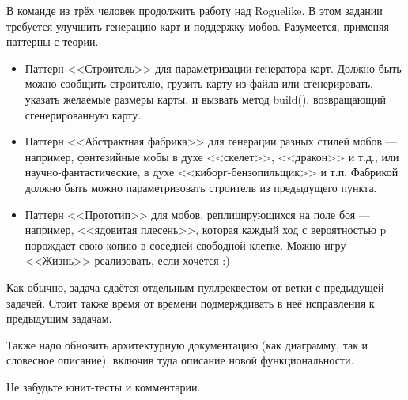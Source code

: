 \documentclass[a5paper]{homework}
\begin{document}

В команде из трёх человек продолжить работу над Roguelike. В этом задании требуется улучшить генерацию карт и поддержку мобов. Разумеется, применяя паттерны с теории.

\begin{itemize}
    \item Паттерн <<Строитель>> для параметризации генератора карт. Должно быть можно сообщить строителю, грузить карту из файла или сгенерировать, указать желаемые размеры карты, и вызвать метод build(), возвращающий сгенерированную карту.
    \item Паттерн <<Абстрактная фабрика>> для генерации разных стилей мобов --- например, фэнтезийные мобы в духе <<скелет>>, <<дракон>> и т.д., или научно-фантастические, в духе <<киборг-бензопильщик>> и т.п. Фабрикой должно быть можно параметризовать строитель из предыдущего пункта.
    \item Паттерн <<Прототип>> для мобов, реплицирующихся на поле боя --- например, <<ядовитая плесень>>, которая каждый ход с вероятностью p порождает свою копию в соседней свободной клетке. Можно игру <<Жизнь>> реализовать, если хочется :)
\end{itemize}

Как обычно, задача сдаётся отдельным пуллреквестом от ветки с предыдущей задачей. Стоит также время от времени подмерждивать в неё исправления к предыдущим задачам.

Также надо обновить архитектурную документацию (как диаграмму, так и словесное описание), включив туда описание новой функциональности.

Не забудьте юнит-тесты и комментарии.
\end{document}

